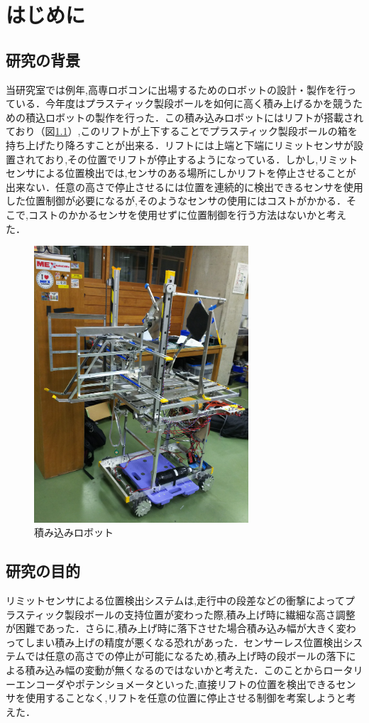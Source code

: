 \chapter{はじめに}

\section{研究の背景}
当研究室では例年,高専ロボコンに出場するためのロボットの設計・製作を行っている．今年度はプラスティック製段ボールを如何に高く積み上げるかを競うための積込ロボットの製作を行った．この積み込みロボットにはリフトが搭載されており（図\ref{fig:robot}）,このリフトが上下することでプラスティック製段ボールの箱を持ち上げたり降ろすことが出来る．リフトには上端と下端にリミットセンサが設置されており,その位置でリフトが停止するようになっている．しかし,リミットセンサによる位置検出では,センサのある場所にしかリフトを停止させることが出来ない．任意の高さで停止させるには位置を連続的に検出できるセンサを使用した位置制御が必要になるが,そのようなセンサの使用にはコストがかかる．そこで,コストのかかるセンサを使用せずに位置制御を行う方法はないかと考えた．

\begin{figure}[htbp]
  \begin{center}
    \includegraphics[width=80mm]{img/robot.JPG}
    \end{center}
  \caption{積み込みロボット}
 \label{fig:robot}
\end{figure}

\section{研究の目的}
リミットセンサによる位置検出システムは,走行中の段差などの衝撃によってプラスティック製段ボールの支持位置が変わった際,積み上げ時に繊細な高さ調整が困難であった．さらに,積み上げ時に落下させた場合積み込み幅が大きく変わってしまい積み上げの精度が悪くなる恐れがあった．センサーレス位置検出システムでは任意の高さでの停止が可能になるため,積み上げ時の段ボールの落下による積み込み幅の変動が無くなるのではないかと考えた．このことからロータリーエンコーダやポテンショメータといった,直接リフトの位置を検出できるセンサを使用することなく,リフトを任意の位置に停止させる制御を考案しようと考えた．


